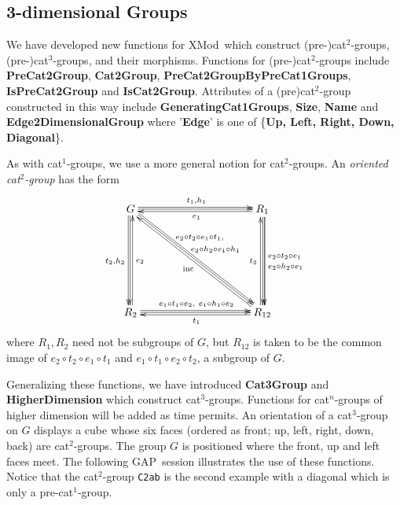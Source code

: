 \documentclass{ws-ijac}
\newcommand{\GAP}      {{\sf GAP}}
\newcommand{\XMod}     {{\sf XMod}}
\begin{document}
\subsection{3-dimensional Groups}

We have developed new functions for \XMod\ which construct 
(pre-)cat$^{2}$-groups, (pre-)cat$^{3}$-groups, and their morphisms. 
Functions for (pre-)cat$^{2} $-groups include \textbf{PreCat2Group},
\textbf{Cat2Group}, \textbf{PreCat2GroupByPreCat1Groups},  
\textbf{IsPreCat2Group} and \textbf{IsCat2Group}. 
Attributes of a (pre)cat$^{2}$-group constructed in this way include 
\textbf{GeneratingCat1Groups}, \textbf{Size}, \textbf{Name} and 
\textbf{Edge2DimensionalGroup} where '\textbf{Edge}' is one of 
\{\textbf{Up, Left, Right, Down, Diagonal}\}.  

As with cat$^1$-groups, we use a more general notion for cat$^2$-groups. 
An \emph{oriented cat$^2$-group} has the form 
\[
\xymatrix@R=80pt@C=100pt 
{ G \ar@<+0.5ex>[r]^{t_1,h_1} \ar@<+0.1ex>[r] 
    \ar@<-0.5ex>[d]_{t_2,h_2} \ar@<-0.1ex>[d] 
    \ar@<+0.5ex>[rd]^(0.35){e_2 \circ t_2 \circ e_1 \circ t_1,} 
    \ar@<+0.1ex>[rd]^(0.45){\ e_2 \circ h_2 \circ e_1 \circ h_1} 
	& R_1 \ar@<+0.5ex>[d]^(0.45){e_2 \circ t_2 \circ e_1} 
	      \ar@<+0.5ex>[d]^(0.55){e_2 \circ h_2 \circ e_1} 
	      \ar@<+0.1ex>[d] 
	      \ar@<+0.4ex>[l]^{e_1} \\
  R_2 \ar@<+0.5ex>[r]^{e_1 \circ t_1 \circ e_2,~ e_1 \circ h_1 \circ e_2} 
      \ar@<+0.1ex>[r] 
      \ar@<-0.4ex>[u]_{e_2} 
	& R_{12} \ar@<+0.4ex>[l]^{t_1} \ar@<+0.4ex>[u]^{t_2} 
	         \ar@<+0.4ex>[ul]^{{\rm inc}} 
}
\]
where $R_1, R_2$ need not be subgroups of $G$, 
but $R_{12}$ is taken to be the common image of 
$e_2 \circ t_2 \circ e_1 \circ t_1$ and 
$e_1 \circ t_1 \circ e_2 \circ t_2$, a subgroup of $G$. 


Generalizing these functions, we have introduced \textbf{Cat3Group} and \textbf{HigherDimension} which construct cat$^{3}$-groups. 
Functions for cat$^{n}$-groups of higher dimension will be added as time permits. 
An orientation of a cat$^{3}$-group on $G$ displays a cube whose six faces 
(ordered as front; up, left, right, down, back) are cat$^{2}$-groups. 
The group $G$ is positioned where the front, up and left faces meet. 
The following \GAP\ session illustrates the use of these functions. 
Notice that the cat$^2$-group \verb|C2ab| is the second example 
with a diagonal which is only a pre-cat$^1$-group. 
\end{document}
